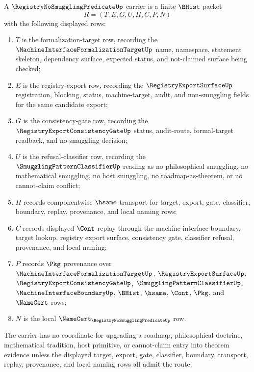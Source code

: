 \begin{definition}
\label{def:registry-no-smuggling-predicate-carrier}
A $\RegistryNoSmugglingPredicateUp$ carrier is a finite $\BHist$ packet
$$
R=(T,E,G,U,H,C,P,N)
$$
with the following displayed rows:
\begin{enumerate}
\item $T$ is the formalization-target row, recording the $\MachineInterfaceFormalizationTargetUp$ name, namespace, statement skeleton, dependency surface, expected status, and not-claimed surface being checked;
\item $E$ is the registry-export row, recording the $\RegistryExportSurfaceUp$ registration, blocking, status, machine-target, audit, and non-smuggling fields for the same candidate export;
\item $G$ is the consistency-gate row, recording the $\RegistryExportConsistencyGateUp$ status, audit-route, formal-target readback, and no-smuggling decision;
\item $U$ is the refusal-classifier row, recording the $\SmugglingPatternClassifierUp$ reading as no philosophical smuggling, no mathematical smuggling, no host smuggling, no roadmap-as-theorem, or no cannot-claim conflict;
\item $H$ records componentwise $\hsame$ transport for target, export, gate, classifier, boundary, replay, provenance, and local naming rows;
\item $C$ records displayed $\Cont$ replay through the machine-interface boundary, target lookup, registry export surface, consistency gate, classifier refusal, provenance, and local naming;
\item $P$ records $\Pkg$ provenance over $\MachineInterfaceFormalizationTargetUp$, $\RegistryExportSurfaceUp$, $\RegistryExportConsistencyGateUp$, $\SmugglingPatternClassifierUp$, $\MachineInterfaceBoundaryUp$, $\BHist$, $\hsame$, $\Cont$, $\Pkg$, and $\NameCert$ rows;
\item $N$ is the local $\NameCert_{\RegistryNoSmugglingPredicateUp}$ row.
\end{enumerate}
The carrier has no coordinate for upgrading a roadmap, philosophical doctrine, mathematical tradition, host primitive, or cannot-claim entry into theorem evidence unless the displayed target, export, gate, classifier, boundary, transport, replay, provenance, and local naming rows all admit the route.
\end{definition}

